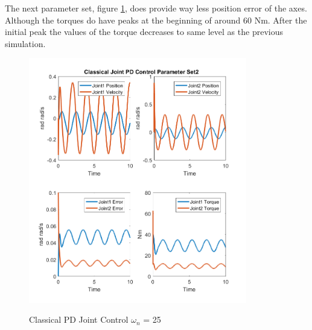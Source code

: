 The next parameter set, figure \ref{fig:ch3_sim22}, does provide way less position error of the axes. Although the torques do have peaks at the beginning of around 60 Nm. After the initial peak the values of the torque decreases to same level as the previous simulation.

\begin{figure}[h]
	\centering
	\includegraphics[width=0.85\textwidth]{pics/ClassicalJointPDControlParameterSet2.png}\\
	\caption{Classical PD Joint Control $\omega_n$ = 25}
	\label{fig:ch3_sim22}
\end{figure}

